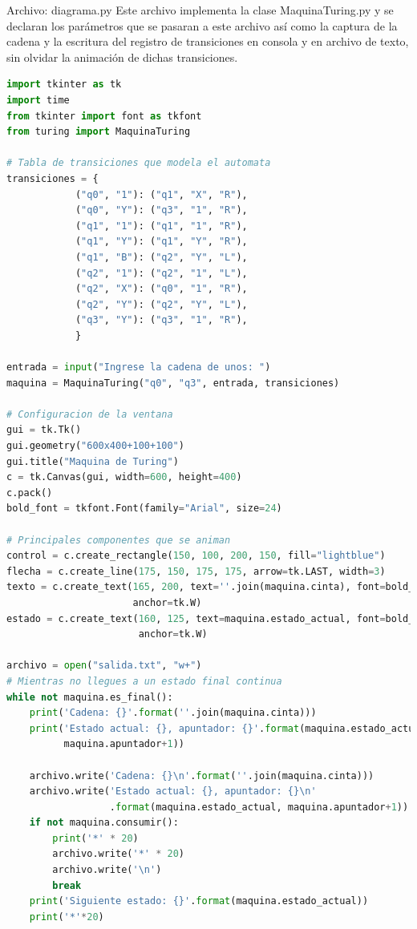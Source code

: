 \documentclass[a4paper,12pt]{article}
\begin{document}
Archivo: diagrama.py
Este archivo implementa la clase MaquinaTuring.py y se declaran los parámetros que se pasaran a este archivo así como la captura de la cadena y la escritura del registro de transiciones en consola y en archivo de texto, sin olvidar la animación de dichas transiciones.
\begin{lstlisting}[language=Python]
import tkinter as tk
import time
from tkinter import font as tkfont
from turing import MaquinaTuring

# Tabla de transiciones que modela el automata
transiciones = {
            ("q0", "1"): ("q1", "X", "R"),
            ("q0", "Y"): ("q3", "1", "R"),
            ("q1", "1"): ("q1", "1", "R"),
            ("q1", "Y"): ("q1", "Y", "R"),
            ("q1", "B"): ("q2", "Y", "L"),
            ("q2", "1"): ("q2", "1", "L"),
            ("q2", "X"): ("q0", "1", "R"),
            ("q2", "Y"): ("q2", "Y", "L"),
            ("q3", "Y"): ("q3", "1", "R"),
            }

entrada = input("Ingrese la cadena de unos: ")
maquina = MaquinaTuring("q0", "q3", entrada, transiciones)

# Configuracion de la ventana
gui = tk.Tk()
gui.geometry("600x400+100+100")
gui.title("Maquina de Turing")
c = tk.Canvas(gui, width=600, height=400)
c.pack()
bold_font = tkfont.Font(family="Arial", size=24)

# Principales componentes que se animan
control = c.create_rectangle(150, 100, 200, 150, fill="lightblue")
flecha = c.create_line(175, 150, 175, 175, arrow=tk.LAST, width=3)
texto = c.create_text(165, 200, text=''.join(maquina.cinta), font=bold_font,
                      anchor=tk.W)
estado = c.create_text(160, 125, text=maquina.estado_actual, font=bold_font,
                       anchor=tk.W)

archivo = open("salida.txt", "w+")
# Mientras no llegues a un estado final continua
while not maquina.es_final():
    print('Cadena: {}'.format(''.join(maquina.cinta)))
    print('Estado actual: {}, apuntador: {}'.format(maquina.estado_actual,
          maquina.apuntador+1))

    archivo.write('Cadena: {}\n'.format(''.join(maquina.cinta)))
    archivo.write('Estado actual: {}, apuntador: {}\n'
                  .format(maquina.estado_actual, maquina.apuntador+1))
    if not maquina.consumir():
        print('*' * 20)
        archivo.write('*' * 20)
        archivo.write('\n')
        break
    print('Siguiente estado: {}'.format(maquina.estado_actual))
    print('*'*20)


\end{lstlisting}
\end{document}
